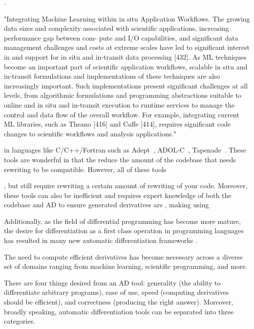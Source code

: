  \cite{Baker2019-ty}.

"Integrating Machine Learning within in situ Application Workflows. The growing data sizes
and complexity associated with scientific applications, increasing performance gap between com-
pute and I/O capabilities, and significant data management challenges and costs at extreme scales
have led to significant interest in and support for in situ and in-transit data processing [432]. As
ML techniques become an important part of scientific application workflows, scalable in situ and
in-transit formulations and implementations of these techniques are also increasingly important.
Such implementations present significant challenges at all levels, from algorithmic formulations
and programming abstractions suitable to online and in situ and in-transit execution to runtime
services to manage the control and data flow of the overall workflow. For example, integrating
current ML libraries, such as Theano [416] and Caffe [414], requires significant code changes to
scientific workflows and analysis applications." 


in languages like C/C++/Fortran such as Adept~\cite{adept}, ADOL-C~\cite{griewank1996algorithm}, Tapenade~\cite{TapenadeRef13}. These tools are wonderful in that the reduce the amount of the codebase that needs rewriting to be compatible. However, all of these tools 

, but still require rewriting a certain amount of rewriting of your code. Moreover, these tools can also be inefficient and requires expert knowledge of both the codebase and AD to ensure generated derivatives are 
, making using 

Additionally, as the field of differential programming has become more mature, the desire for differentiation as a first class operation in programming languages has resulted in many new automatic differentiation frameworks .

The need to compute efficient derivatives has become necessary across a diverse set of domains ranging from machine learning, scientific programming, and more. 

There are four things desired from an AD tool: generality (the ability to differentiate arbitrary programs), ease of use, speed (computing derivatives should be efficient), and correctness (producing the right answer). Moreover, broadly speaking, automatic differentiation tools can be separated into three categories.




